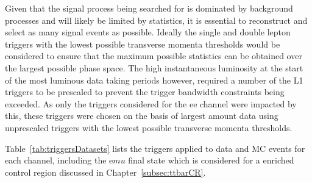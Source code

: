 Given that the signal process being searched for is dominated by background processes and will likely be limited by statistics, it is essential to reconstruct and select as many signal events as possible.
Ideally the single and double lepton triggers with the lowest possible transverse momenta thresholds would be considered to ensure that the maximum possible statistics can be obtained over the largest possible phase space.
The high instantaneous luminosity at the start of the most luminous data taking periods however, required a number of the L1 triggers to be prescaled to prevent the trigger bandwidth constraints being exceeded.
As only the triggers considered for the ee channel were impacted by this, these triggers were chosen on the basis of largest amount data using unprescaled triggers with the lowest possible transverse momenta thresholds.

Table~\ref{tab:triggersDatasets} lists the triggers applied to data and MC events for each channel, including the e$mu$ final state which is considered for a \ttbar enriched control region discussed in Chapter~\ref{subsec:ttbarCR}.

\begin{table}[htbp]
\label{tab:triggersDatasets}
  \centering
\end{table}

